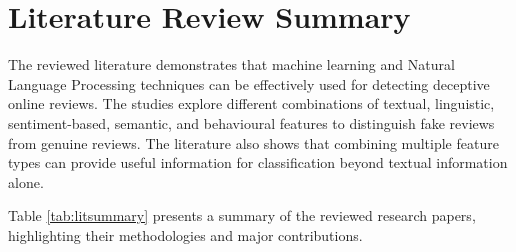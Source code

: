\documentclass[12pt,a4paper]{report}
\begin{document}
\newpage

\section{Literature Review Summary}

The reviewed literature demonstrates that machine learning
and Natural Language Processing techniques can be effectively
used for detecting deceptive online reviews. The studies
explore different combinations of textual, linguistic,
sentiment-based, semantic, and behavioural features to
distinguish fake reviews from genuine reviews. The literature
also shows that combining multiple feature types can provide
useful information for classification beyond textual
information alone.

Table \ref{tab:litsummary} presents a summary of the
reviewed research papers, highlighting their methodologies
and major contributions.
\end{document}
